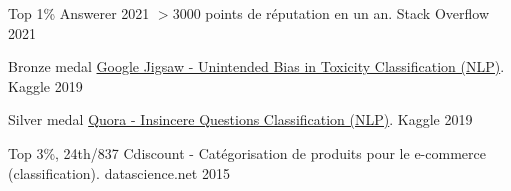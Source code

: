 
\begin{cvhonors}
  \cvhonor
    {Top 1\% Answerer 2021} %
    {$>3000$ points de réputation en un an.} %
    {Stack Overflow} %
    {2021} %
    
  \cvhonor
    {Bronze medal} %
    {\href{https://www.kaggle.com/competitions/jigsaw-unintended-bias-in-toxicity-classification}{Google Jigsaw - Unintended Bias in Toxicity Classification (NLP)}.} %
    {Kaggle} %
    {2019} %

  \cvhonor
    {Silver medal} %
    {\href{https://www.kaggle.com/c/quora-insincere-questions-classification}{Quora - Insincere Questions Classification (NLP)}.} %
    {Kaggle} %
    {2019} %

  \cvhonor
    {Top 3\%, 24th/837} %
    {Cdiscount - Catégorisation de produits pour le e-commerce (classification).} %
    {datascience.net} %
    {2015} %

\end{cvhonors}


